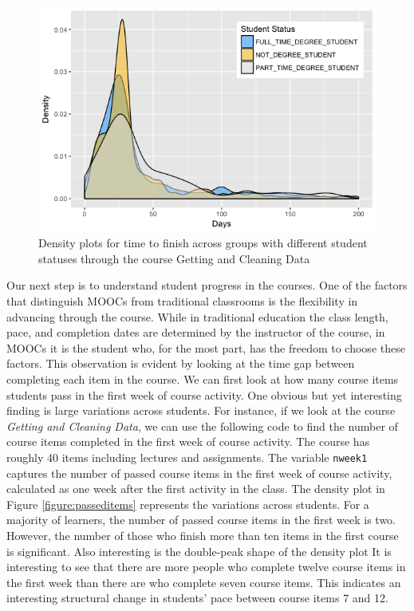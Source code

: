 \begin{figure}[htbp]
    \centering
    \includegraphics[scale=0.5]{stustatus}
    \caption{Density plots for time to finish across groups with different student statuses through the course Getting and Cleaning Data}
    \label{figure:stustatus}
\end{figure}

Our next step is to understand student progress in the courses. One of
the factors that distinguish MOOCs from traditional classrooms is the
flexibility in advancing through the course. While in traditional
education the class length, pace, and completion dates are determined by
the instructor of the course, in MOOCs it is the student who, for the
most part, has the freedom to choose these factors. This observation is
evident by looking at the time gap between completing each item in the
course. We can first look at how many course items students pass in the
first week of course activity. One obvious but yet interesting finding
is large variations across students. For instance, if we look at the
course \emph{Getting and Cleaning Data}, we can use the following code
to find the number of course items completed in the first week of course
activity. The course has roughly 40 items including lectures and
assignments. The variable \texttt{nweek1} captures the number of passed
course items in the first week of course activity, calculated as one
week after the first activity in the class. The density plot in Figure
\ref{figure:passeditems} represents the variations across students. For
a majority of learners, the number of passed course items in the first
week is two. However, the number of those who finish more than ten items
in the first course is significant. Also interesting is the double-peak
shape of the density plot It is interesting to see that there are more
people who complete twelve course items in the first week than there are
who complete seven course items. This indicates an interesting
structural change in students' pace between course items 7 and 12.

